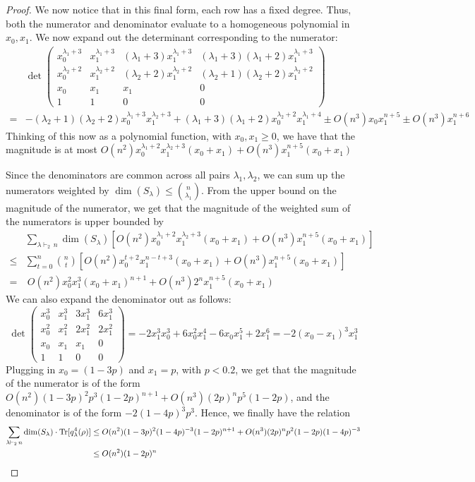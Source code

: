 \documentclass[11pt]{article}
\DeclareMathOperator{\Tr}{Tr}
\begin{document}
\begin{proof}
We now notice that in this final form, each row has a fixed degree. Thus, both the numerator and denominator evaluate to a homogeneous polynomial in $x_0,x_1$. We now expand out the determinant corresponding to the numerator:
\begin{align*}
    &\det\begin{pmatrix}
        x_0^{\lambda_1+3}&x_1^{\lambda_1+3}&(\lambda_1+3)x_1^{\lambda_1+3}&(\lambda_1+3)(\lambda_1+2)x_1^{\lambda_1+3}\\
        x_0^{\lambda_2+2}&x_1^{\lambda_2+2}&(\lambda_2+2)x_1^{\lambda_2+2}&(\lambda_2+1)(\lambda_2+2)x_1^{\lambda_2+2}\\
        x_0&x_1&x_1&0\\
        1&1&0&0
    \end{pmatrix} \\
    =& -(\lambda_2+1)(\lambda_2+2)x_0^{\lambda_1+3}x_1^{\lambda_2+3}+(\lambda_1+3)(\lambda_1+2)x_0^{\lambda_2+2}x_1^{\lambda_1+4}\pm O(n^3)x_0x_1^{n+5} \pm O(n^3)x_1^{n+6}
\end{align*}
Thinking of this now as a polynomial function, with $x_0,x_1\geq 0$, we have that the magnitude is at most $O(n^2)x_0^{\lambda_1+2}x_1^{\lambda_2+3}(x_0+x_1) + O(n^3)x_1^{n+5}(x_0+x_1)$

    Since the denominators are common across all pairs $\lambda_1,\lambda_2$, we can sum up the numerators weighted by $\dim(S_\lambda) \leq \binom n {\lambda_1}$. From the upper bound on the magnitude of the numerator, we get that the magnitude of the weighted sum of the numerators is upper bounded by 
\begin{align*}
    &\sum_{\lambda \vdash_2\, n}\dim(S_\lambda)\left[O(n^2)x_0^{\lambda_1+2}x_1^{\lambda_2+3}(x_0+x_1)+O(n^3)x_1^{n+5}(x_0+x_1)\right] \\
    \leq &\sum_{t=0}^{n}\binom {n}{t}\left[O(n^2)x_0^{t+2}x_1^{n-t+3}(x_0+x_1)+O(n^3)x_1^{n+5}(x_0+x_1)\right] \\
    = &~O(n^2) x_0^2x_1^3(x_0+x_1)^{n+1}+O(n^3)2^{n}x_1^{n+5}(x_0+x_1)
\end{align*}
    We can also expand the denominator out as follows:
    \[\det\begin{pmatrix}
        x_0^{3}&x_1^{3}&3x_1^{3}&6x_1^3\\
        x_0^{2}&x_1^{2}&2x_1^{2}&2x_1^2\\
        x_0&x_1&x_1&0\\
        1&1&0&0
    \end{pmatrix}=-2x_1^3x_0^3+6x_0^2x_1^4-6x_0x_1^5+2x_1^6=-2(x_0-x_1)^3x_1^3\]
Plugging in $x_0=(1-3p)$ and $x_1=p$, with $p<0.2$, we get that the magnitude of the numerator is of the form $O(n^2)(1-3p)^2p^3(1-2p)^{n+1} +O(n^3)(2p)^np^{5}(1-2p)$, and the denominator is of the form $-2(1-4p)^3p^3$. Hence, we finally have the relation
\begin{align*}
    \sum_{\lambda\vdash_2\, n}\dim(S_\lambda)\cdot \Tr[q_\lambda^4(\rho)] &\leq O(n^2)(1-3p)^2(1-4p)^{-3}(1-2p)^{n+1}+ O(n^3)(2p)^{n}p^2(1-2p)(1-4p)^{-3} \\
    &\leq O(n^2)(1-2p)^{n} \qedhere
\end{align*}
\end{proof}
\end{document}
